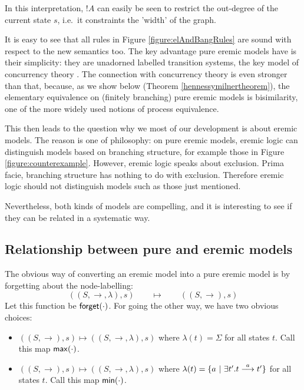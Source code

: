 In this interpretation, $!A$ can easily be seen to restrict the
out-degree of the current state $s$, i.e.~it constraints the 'width'
of the graph.

It is easy to see that all rules in Figure \ref{figure:elAndBangRules}
are sound with respect to the new semantics too.  The key advantage pure eremic models have is their
simplicity: they are unadorned labelled transition systems, the key
model of concurrency theory \cite{SassoneV:modcontac}. The connection
with concurrency theory is even stronger than that, because, as we
show below (Theorem \ref{hennessymilnertheorem}), the elementary
equivalence on (finitely branching) pure eremic models is
bisimilarity, one of the more widely used notions of process
equivalence.

This then leads to the question why we most of our development is
about eremic models. The reason is one of philosophy: on pure eremic
models, eremic logic can distinguish models based on branching
structure, for example those in Figure
\ref{figure:counterexample}. However, eremic logic speaks about
exclusion. Prima facie, branching structure has nothing to do with
exclusion. Therefore eremic logic should not distinguish models such
as those just mentioned.

Nevertheless, both kinds of models are compelling, and it is
interesting to see if they can be related in a systematic way.

\subsection{Relationship between pure and eremic models}

The obvious way of converting an eremic model into a pure eremic model
is by forgetting about the node-labelling:
\[
   ((S, \rightarrow, \lambda), s ) \qquad\mapsto\qquad ((S, \rightarrow), s ) 
\]
Let this function be $\mathsf{forget}(\cdot)$. For going the other way, we
have two obvious choices:

\begin{itemize}

\item $((S, \rightarrow), s ) \mapsto ((S, \rightarrow, \lambda), s )$
  where $\lambda(t) = \Sigma$ for all states $t$. Call this map $\mathsf{max}(\cdot)$.

\item $((S, \rightarrow), s ) \mapsto ((S, \rightarrow, \lambda), s )$
  where $\lambda(t) = \{a \ |\ \exists t'. t \stackrel{a}{\longrightarrow} t'\}$ for all
  states $t$. Call this map $\mathsf{min}(\cdot)$.

\end{itemize}

